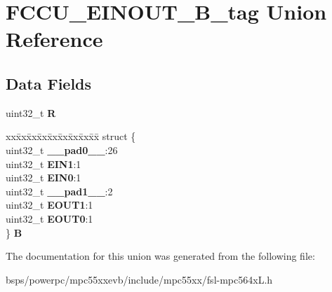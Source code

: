 \hypertarget{unionFCCU__EINOUT__32B__tag}{}\section{F\+C\+C\+U\+\_\+\+E\+I\+N\+O\+U\+T\+\_\+B\+\_\+tag Union Reference}
\label{unionFCCU__EINOUT__32B__tag}
\subsection*{Data Fields}
\begin{DoxyCompactItemize}
\item 
\mbox{\label{unionFCCU__EINOUT__32B__tag_a4f31141a8a8cccab7af7ea61e143c8d8}} 
uint32\+\_\+t {\bfseries R}
\item 
\mbox{\label{unionFCCU__EINOUT__32B__tag_a3d455848e1f37faee1a45d6ff8877c2a}} 
\begin{tabbing}
xx\=xx\=xx\=xx\=xx\=xx\=xx\=xx\=xx\=\kill
struct \{\\
\>uint32\_t {\bfseries \_\_pad0\_\_}:26\\
\>uint32\_t {\bfseries EIN1}:1\\
\>uint32\_t {\bfseries EIN0}:1\\
\>uint32\_t {\bfseries \_\_pad1\_\_}:2\\
\>uint32\_t {\bfseries EOUT1}:1\\
\>uint32\_t {\bfseries EOUT0}:1\\
\} {\bfseries B}\\

\end{tabbing}\end{DoxyCompactItemize}


The documentation for this union was generated from the following file\+:\begin{DoxyCompactItemize}
\item 
bsps/powerpc/mpc55xxevb/include/mpc55xx/fsl-\/mpc564x\+L.\+h\end{DoxyCompactItemize}
